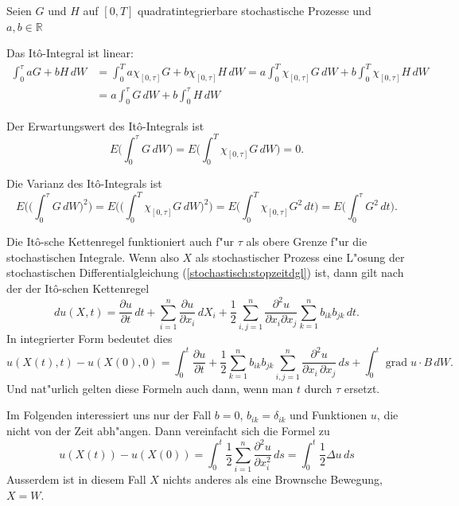 \begin{hilfssatz}
Seien $G$ und $H$ auf $[0,T]$ quadratintegrierbare stochastische Prozesse
und $a,b\in\mathbb R$
\begin{compactenum}
\item
Das It\^o-Integral ist linear:
\begin{align*}
\int_0^\tau aG+bH\,dW
&=
\int_0^T a\chi_{[0,\tau]} G + b \chi_{[0,\tau]} H\,dW
=
a\int_0^T \chi_{[0,\tau]} G\,dW + b \int_0^T\chi_{[0,\tau]} H\,dW
\\
&=
a\int_0^\tau G\,dW + b \int_0^\tau H\,dW
\end{align*}
\item Der Erwartungswert des It\^o-Integrals ist
\[
E\biggl(\int_0^\tau G\,dW\biggr)
=
E\biggl(\int_0^T \chi_{[0,\tau]}G\,dW\biggr)
=
0.
\]
\item Die Varianz des It\^o-Integrals ist
\[
E\biggl(\biggl(\int_0^\tau G\,dW\biggr)^2\biggr)
=
E\biggl(\biggl(\int_0^T \chi_{[0,\tau]}G\,dW\biggr)^2\biggr)
=
E\biggl(\int_0^T\chi_{[0,\tau]}G^2\,dt\biggr)
=
E\biggl(\int_0^\tau G^2\,dt\biggr).
\]
\end{compactenum}
\end{hilfssatz}

Die It\^o-sche Kettenregel funktioniert auch f"ur $\tau$ als obere
Grenze f"ur die stochastischen Integrale.
Wenn also $X$ als stochastischer Prozess eine L"osung der stochastischen
Differentialgleichung (\ref{stochastisch:stopzeitdgl}) ist, dann gilt
nach der der It\^o-schen Kettenregel
\[
du(X,t)
=
\frac{\partial u}{\partial t}\,dt
+
\sum_{i=1}^n\frac{\partial u}{\partial x_i}\,dX_i
+
\frac12\sum_{i,j=1}^n\frac{\partial^2 u}{\partial x_i\partial x_j}
\sum_{k=1}^n b_{ik}b_{jk}\,dt.
\]
In integrierter Form bedeutet dies
\[
u(X(t),t)-u(X(0),0)
=
\int_0^t
\frac{\partial u}{\partial t}
+
\frac12\sum_{k=1}^nb_{ik}b_{jk}
\sum_{i,j=1}^n \frac{\partial^2u}{\partial x_i\,\partial x_j} \,ds
+
\int_0^t \operatorname{grad} u\cdot B\,dW.
\]
Und nat"urlich gelten diese Formeln auch dann, wenn man $t$ durch $\tau$
ersetzt.

Im Folgenden interessiert uns nur der Fall $b=0$, $b_{ik}=\delta_{ik}$
und Funktionen $u$, die nicht von der Zeit abh"angen.
Dann vereinfacht sich die Formel zu
\begin{equation}
u(X(t))-u(X(0))
=
\int_0^t \frac12\sum_{i=1}^n\frac{\partial^2 u}{\partial x_i^2}\,ds
=
\int_0^t \frac12\Delta u\,ds
\label{stochastisch:laplaceinkrement}
\end{equation}
Ausserdem ist in diesem Fall $X$ nichts anderes als eine Brownsche Bewegung,
$X=W$.

